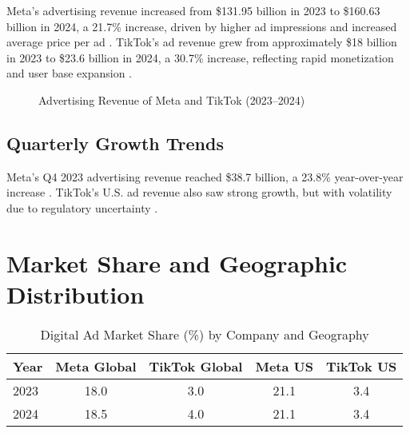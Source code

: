 \documentclass{article}
\begin{document}
Meta's advertising revenue increased from \$131.95 billion in 2023 to \$160.63 billion in 2024, a 21.7\% increase, driven by higher ad impressions and increased average price per ad \cite{meta_oberlo,meta_ycharts,meta_q4_2024}. TikTok's ad revenue grew from approximately \$18 billion in 2023 to \$23.6 billion in 2024, a 30.7\% increase, reflecting rapid monetization and user base expansion \cite{tiktok_oberlo,tiktok_sendshort}.

\begin{figure}[ht]
\centering
{}
\caption{Advertising Revenue of Meta and TikTok (2023--2024)}
\label{fig:ad_revenue_bar}
\end{figure}

\subsection{Quarterly Growth Trends}

Meta's Q4 2023 advertising revenue reached \$38.7 billion, a 23.8\% year-over-year increase \cite{meta_q4_2023,meta_searchengineland}. TikTok's U.S. ad revenue also saw strong growth, but with volatility due to regulatory uncertainty \cite{tiktok_statista_us,tiktok_roirevolution}.

\section{Market Share and Geographic Distribution}

\begin{table}[ht]
\centering
\caption{Digital Ad Market Share (\%) by Company and Geography}
\label{tab:market_share}
\begin{tabularx}{\textwidth}{l S[table-format=2.1] S[table-format=2.1] S[table-format=2.1] S[table-format=2.1]}
\toprule
Year & {Meta Global} & {TikTok Global} & {Meta US} & {TikTok US} \\
 & 18.0 & 3.0 & 21.1 & 3.4 \\
2024 & 18.5 & 4.0 & 21.1 & 3.4 \\
\bottomrule
\end{tabularx}
\end{table}
\end{document}
